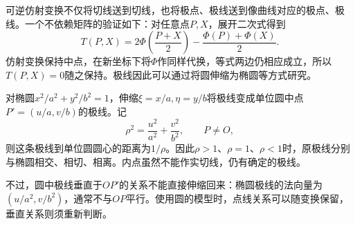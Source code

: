 可逆仿射变换不仅将切线送到切线，也将极点、极线送到像曲线对应的极点、极线。一个不依赖矩阵的验证如下：对任意点\(P,X\)，展开二次式得到
\begin{equation}\label{eq:quadratic-polar-midpoint-identity}
 T(P,X)=2\Phi\left(\frac{P+X}{2}\right)
       -\frac{\Phi(P)+\Phi(X)}{2}.
\end{equation}
仿射变换保持中点，在新坐标下将\(\Phi\)作同样代换，等式两边仍相应成立，所以\(T(P,X)=0\)随之保持。极线因此可以通过将圆伸缩为椭圆等方式研究。

对椭圆\(x^2/a^2+y^2/b^2=1\)，伸缩\(\xi=x/a,\eta=y/b\)将极线变成单位圆中点\(P'=(u/a,v/b)\)的极线。记
\begin{equation*}
 \rho^2=\frac{u^2}{a^2}+\frac{v^2}{b^2},\qquad P\ne O,
\end{equation*}
则这条极线到单位圆圆心的距离为\(1/\rho\)。因此\(\rho>1\)、\(\rho=1\)、\(\rho<1\)时，原极线分别与椭圆相交、相切、相离。内点虽然不能作实切线，仍有确定的极线。

不过，圆中极线垂直于\(OP'\)的关系不能直接伸缩回来：椭圆极线的法向量为\((u/a^2,v/b^2)\)，通常不与\(OP\)平行。使用圆的模型时，点线关系可以随变换保留，垂直关系则须重新判断。

